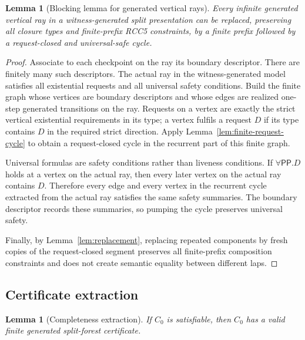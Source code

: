 \documentclass[11pt]{article}
\newtheorem{lemma}[theorem]{Lemma}
\newcommand{\PP}{\mathsf{PP}}
\begin{document}
\begin{lemma}[Blocking lemma for generated vertical rays]\label{lem:blocking}
Every infinite generated vertical ray in a witness-generated split presentation can be replaced, preserving all closure types and finite-prefix RCC5 constraints, by a finite prefix followed by a request-closed and universal-safe cycle.
\end{lemma}

\begin{proof}
Associate to each checkpoint on the ray its boundary descriptor.  There are finitely many such descriptors.  The actual ray in the witness-generated model satisfies all existential requests and all universal safety conditions.  Build the finite graph whose vertices are boundary descriptors and whose edges are realized one-step generated transitions on the ray.  Requests on a vertex are exactly the strict vertical existential requirements in its type; a vertex fulfils a request $D$ if its type contains $D$ in the required strict direction.  Apply Lemma~\ref{lem:finite-request-cycle} to obtain a request-closed cycle in the recurrent part of this finite graph.

Universal formulas are safety conditions rather than liveness conditions.  If $\forall\PP.D$ holds at a vertex on the actual ray, then every later vertex on the actual ray contains $D$.  Therefore every edge and every vertex in the recurrent cycle extracted from the actual ray satisfies the same safety summaries.  The boundary descriptor records these summaries, so pumping the cycle preserves universal safety.

Finally, by Lemma~\ref{lem:replacement}, replacing repeated components by fresh copies of the request-closed segment preserves all finite-prefix composition constraints and does not create semantic equality between different laps.
\end{proof}

\subsection{Certificate extraction}


\begin{lemma}[Completeness extraction]\label{lem:extraction}
If $C_0$ is satisfiable, then $C_0$ has a valid finite generated split-forest certificate.
\end{lemma}
\end{document}

